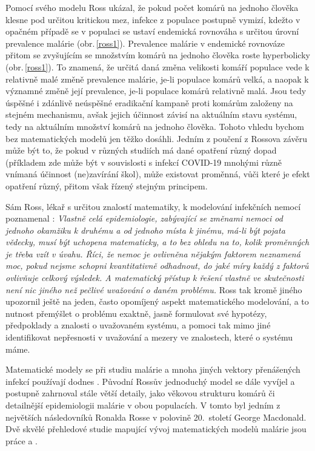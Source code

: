 Pomocí svého modelu \cite{Smith_etal2012} Ross ukázal, že pokud počet komárů na jednoho člověka klesne pod určitou kritickou mez, infekce z populace postupně vymizí, kdežto v opačném případě se v populaci se ustaví endemická rovnováha s určitou úrovní prevalence malárie (obr.\,\ref{ross1}). Prevalence malárie v endemické rovnováze přitom se zvyšujícím se množstvím komárů na jednoho člověka roste hyperbolicky (obr.\,\ref{ross1}). To znamená, že určitá daná změna velikosti komáří populace vede k relativně malé změně prevalence malárie, je-li populace komárů velká, a naopak k významné změně její prevalence, je-li populace komárů relativně malá. Jsou tedy úspěšné i zdánlivě neúspěšné eradikační kampaně proti komárům založeny na stejném mechanismu, avšak jejich účinnost závisí na aktuálním stavu systému, tedy na aktuálním množství komárů na jednoho člověka. Tohoto vhledu bychom bez matematických modelů jen těžko dosáhli. Jedním z poučení z Rossova závěru může být to, že pokud v různých studiích má dané opatření různý dopad (příkladem zde může být v souvislosti s infekcí COVID-19 mnohými různě vnímaná účinnost (ne)zavírání škol), může existovat proměnná, vůči které je efekt opatření různý, přitom však řízený stejným principem. 

Sám Ross, lékař s určitou znalostí matematiky, k modelování infekčních nemocí poznamenal \cite{Bacaer2011}: \emph{Vlastně celá epidemiologie, zabývající se změnami nemoci od jednoho okamžiku k druhému a od jednoho místa k jinému, má-li být pojata vědecky, musí být uchopena matematicky, a to bez ohledu na to, kolik proměnných je třeba vzít v úvahu. Říci, že nemoc je ovlivněna nějakým faktorem neznamená moc, pokud nejsme schopni kvantitativně odhadnout, do jaké míry každý z faktorů ovlivňuje celkový výsledek. A matematický přístup k řešení vlastně ve skutečnosti není nic jiného než pečlivé uvažování o daném problému.} Ross tak kromě jiného upozornil ještě na jeden, často opomíjený aspekt matematického modelování, a to nutnost přemýšlet o problému exaktně, jasně formulovat své hypotézy, předpoklady a znalosti o uvažovaném systému, a pomoci tak mimo jiné identifikovat nepřesnosti v uvažování a mezery ve znalostech, které o systému máme.     

Matematické modely se při studiu malárie a mnoha jiných vektory přenášených infekcí používají dodnes \cite{Gratz1999,Reiner_etal2012}. Původní Rossův jednoduchý model se dále vyvíjel a postupně zahrnoval stále větší detaily, jako věkovou strukturu komárů či detailnější epidemiologii malárie v obou populacích. V tomto byl jedním z největších následovníků Ronalda Rosse v polovině 20.\ století George Macdonald. Dvě skvělé přehledové studie mapující vývoj matematických modelů malárie jsou práce \cite{Smith_etal2012} a \cite{Smith_etal2018}.

